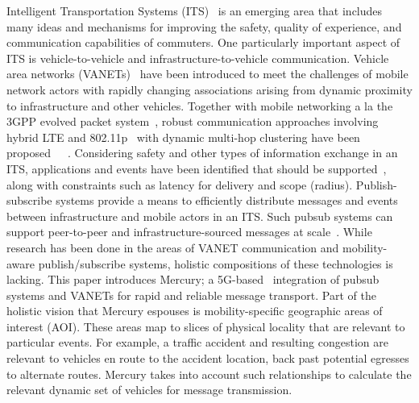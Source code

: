 
Intelligent Transportation Systems (ITS)~\cite{ITS} is an emerging
area that includes many ideas and mechanisms for improving the safety,
quality of experience, and communication capabilities of
commuters. One particularly important aspect of ITS is
vehicle-to-vehicle and infrastructure-to-vehicle
communication. Vehicle area networks (VANETs)~\cite{VANET} have been
introduced to meet the challenges of mobile network actors with
rapidly changing associations arising from dynamic proximity to
infrastructure and other vehicles. Together with mobile networking a
la the 3GPP evolved packet system~\cite{3GPP}, robust communication
approaches involving hybrid LTE and 802.11p~\cite{802.11p} with
dynamic multi-hop clustering have been
proposed~\cite{VMasC}~\cite{MDMAC}~\cite{NHop}. Considering safety and
other types of information exchange in an ITS, applications and events
have been identified that should be supported~\cite{vanet-apps}, along
with constraints such as latency for delivery and scope
(radius). Publish-subscribe systems provide a means to efficiently
distribute messages and events between infrastructure and mobile
actors in an ITS. Such pubsub systems can support peer-to-peer and
infrastructure-sourced messages at scale~\cite{MoPS-scaling}.  While
research has been done in the areas of VANET communication and
mobility-aware publish/subscribe systems, holistic compositions of
these technologies is lacking.  This paper introduces Mercury; a
5G-based~\cite{5G} integration of pubsub systems and VANETs for rapid
and reliable message transport.  Part of the holistic vision that
Mercury espouses is mobility-specific geographic areas of interest
(AOI). These areas map to slices of physical locality that are
relevant to particular events.  For example, a traffic accident and
resulting congestion are relevant to vehicles en route to the accident
location, back past potential egresses to alternate routes.  Mercury
takes into account such relationships to calculate the relevant dynamic
set of vehicles for message transmission.

